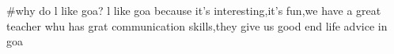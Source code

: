 #why do l like goa?
l like goa because it's interesting,it's fun,we have a great teacher whu has grat communication skills,they give us good end life advice in goa